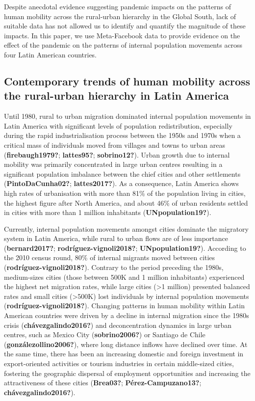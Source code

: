 \documentclass[11pt,letterpaper]{article}
\begin{document}
Despite anecdotal evidence suggesting pandemic impacts on the patterns
of human mobility across the rural-urban hierarchy in the Global South,
lack of suitable data has not allowed us to identify and quantify the
magnitude of these impacts. In this paper, we use Meta-Facebook data to
provide evidence on the effect of the pandemic on the patterns of
internal population movements across four Latin American countries.

\subsection{Contemporary trends of human mobility across the rural-urban hierarchy in Latin America}

Until 1980, rural to urban migration dominated internal population
movements in Latin America with significant levels of population
redistribution, especially during the rapid industrialisation process
between the 1950s and 1970s when a critical mass of individuals moved
from villages and towns to urban areas (\textbf{firebaugh1979?};
\textbf{lattes95?}; \textbf{sobrino12?}). Urban growth due to internal
mobility was primarily concentrated in large urban centres resulting in
a significant population imbalance between the chief cities and other
settlements (\textbf{PintoDaCunha02?}; \textbf{lattes2017?}). As a
consequence, Latin America shows high rates of urbanisation with more
than 81\% of the population living in cities, the highest figure after
North America, and about 46\% of urban residents settled in cities with
more than 1 million inhabitants (\textbf{UNpopulation19?}).

Currently, internal population movements amongst cities dominate the
migratory system in Latin America, while rural to urban flows are of
less importance (\textbf{bernard2017?}; \textbf{rodríguez-vignoli2018?};
\textbf{UNpopulation19?}). According to the 2010 census round, 80\% of
internal migrants moved between cities
(\textbf{rodríguez-vignoli2018?}). Contrary to the period preceding the
1980s, medium-sizes cities (those between 500K and 1 million
inhabitants) experienced the highest net migration rates, while large
cities (\textgreater1 million) presented balanced rates and small cities
(\textgreater500K) lost individuals by internal population movements
(\textbf{rodríguez-vignoli2018?}). Changing patterns in human mobility
within Latin American countries were driven by a decline in internal
migration since the 1980s crisis (\textbf{chávezgalindo2016?}) and
deconcentration dynamics in large urban centres, such as Mexico City
(\textbf{sobrino2006?}) or Santiago de Chile
(\textbf{gonzálezollino2006?}), where long distance inflows have
declined over time. At the same time, there has been an increasing
domestic and foreign investment in export-oriented activities or tourism
industries in certain middle-sized cities, fostering the geographic
dispersal of employment opportunities and increasing the attractiveness
of these cities (\textbf{Brea03?}; \textbf{Pérez-Campuzano13?};
\textbf{chávezgalindo2016?}).
\end{document}
